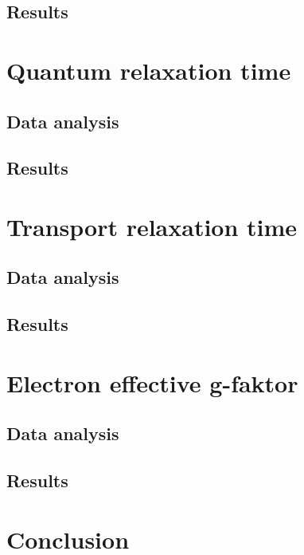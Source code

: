 \documentclass[12pt,a4paper]{article}
\begin{document}
\subsection{Results}



\section{Quantum relaxation time}
\subsection{Data analysis}


\subsection{Results}



\section{Transport relaxation time}
\subsection{Data analysis}

\subsection{Results}



\section{Electron effective g-faktor}
\subsection{Data analysis}

\subsection{Results}



\section{Conclusion}
\end{document}
